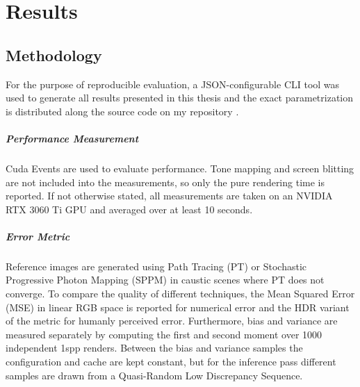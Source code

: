 
\chapter{Results}
\label{chap:results}

\section{Methodology}
For the purpose of reproducible evaluation, a JSON-configurable CLI tool was used to generate all results presented in this thesis and the exact parametrization is distributed along the source code on my repository \parencite{stamm2025}.

\paragraph{Performance Measurement}
Cuda Events are used to evaluate performance.
Tone mapping and screen blitting are not included into the measurements, so only the pure rendering time is reported.
If not otherwise stated, all measurements are taken on an NVIDIA RTX 3060 Ti GPU and averaged over at least 10 seconds.

\paragraph{Error Metric}
Reference images are generated using Path Tracing (PT) or Stochastic Progressive Photon Mapping (SPPM) \parencite{hachisuka2009a} in caustic scenes where PT does not converge.
To compare the quality of different techniques, the Mean Squared Error (MSE) in linear RGB space is reported for numerical error and the HDR variant of the \FLIP metric \parencite{andersson2021} for humanly perceived error.
Furthermore, bias and variance are measured separately by computing the first and second moment over 1000 independent 1spp renders.
Between the bias and variance samples the configuration and cache are kept constant, but for the inference pass different samples are drawn from a Quasi-Random Low Discrepancy Sequence.


